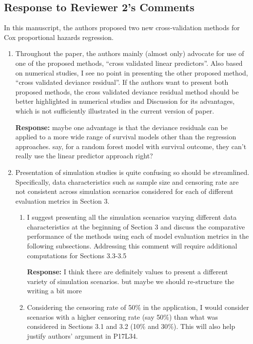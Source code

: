 \documentclass[12]{article}
\newcommand{\re}{\textbf{Response: }}
\newcommand\bd[1]{{\color{blue}#1}}
\begin{document}
\subsection*{Response to Reviewer 2's Comments}
In this manuscript, the authors proposed two new cross-validation methods for Cox proportional hazards regression.

\begin{enumerate}[align = left]
\item Throughout the paper, the authors mainly (almost only) advocate for use of one of the proposed methods, “cross validated linear predictors”. Also based on numerical studies, I see no point in presenting the other proposed method, “cross validated deviance residual”. If the authors want to present both proposed methods, the cross validated deviance residual method should be better highlighted in numerical studies and Discussion for its advantages, which is not sufficiently illustrated in the current version of paper.

\re \bd{maybe one advantage is that the deviance residuals can be applied to a more wide range of survival models other than the regression approaches. say, for a random forest model with survival outcome, they can't really use the linear predictor approach right?}

\item Presentation of simulation studies is quite confusing so should be streamlined. Specifically, data characteristics such as sample size and censoring rate are not consistent across simulation scenarios considered for each of different evaluation metrics in Section 3.

    \begin{enumerate}
    \item I suggest presenting all the simulation scenarios varying different data characteristics at the beginning of Section 3 and discuss the comparative performance of the methods using each of model evaluation metrics in the following subsections. Addressing this comment will require additional computations for Sections 3.3-3.5
    
    \re \bd{I think there are definitely values to present a different variety of simulation scenarios. but maybe we should re-structure the writing a bit more}

    \item Considering the censoring rate of 50$\%$ in the application, I would consider scenarios with a higher censoring rate (say 50$\%$) than what was considered in Sections 3.1 and 3.2 (10$\%$ and 30$\%$). This will also help justify authors’ argument in P17L34. 
    

\end{enumerate}
\end{enumerate}
\end{document}
